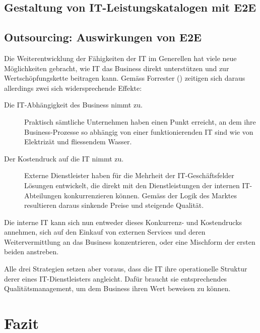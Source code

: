 \documentclass[11pt,listof=totoc]{scrreprt} %
\theoremstyle{definition}
\begin{document}
\section{Gestaltung von IT-Leistungskatalogen mit E2E}

\section{Outsourcing: Auswirkungen von E2E}

Die Weiterentwicklung der Fähigkeiten der IT im Generellen hat viele neue Möglichkeiten gebracht, wie IT das Business direkt unterstützen und zur Wertschöpfungskette beitragen kann. Gemäss Forrester (\cite{forrester:slaBestPractices}) zeitigen sich daraus allerdings zwei sich widersprechende Effekte:

\begin{description}
\item[Die IT-Abhängigkeit des Business nimmt zu.] Praktisch sämtliche Unternehmen haben einen Punkt erreicht, an dem ihre Business-Prozesse so abhängig von einer funktionierenden IT sind wie von Elektrizät und fliessendem Wasser.
\item[Der Kostendruck auf die IT nimmt zu.] Externe Dienstleister haben für die Mehrheit der IT-Geschäftsfelder Lösungen entwickelt, die direkt mit den Dienstleistungen der internen IT-Abteilungen konkurrenzieren können. Gemäss der Logik des Marktes resultieren daraus sinkende Preise und steigende Qualität.
\end{description}

Die interne IT kann sich nun entweder dieses Konkurrenz- und Kostendrucks annehmen, sich auf den Einkauf von externen Services und deren Weitervermittlung an das Business konzentrieren, oder eine Mischform der ersten beiden anstreben.

Alle drei Strategien setzen aber voraus, dass die IT ihre operationelle Struktur derer eines IT-Dienstleisters angleicht. Dafür braucht sie entsprechendes Qualitätsmanagement, um dem Business ihren Wert beweisen zu können.

\chapter{Fazit}

\listoffigures



\end{document}
